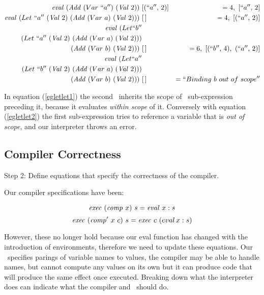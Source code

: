 \documentclass {article}
\begin{document}
\begin{align}
\mathit{eval\ }  (\mathit{Add\ } (Var\ ``a'')\ (\mathit{Val\ } 2))\ &[(``a'',\, 2)] 
			&= 4,\ [``a'',\, 2] \nonumber \\
\mathit{eval\ }  (Let\ ``a''\ (\mathit{Val\ } 2)\ (\mathit{Add\ } (Var\ a)\ (\mathit{Val\ } 2))  )\ &[\, ] 
		&= 4,\ [(``a'',\, 2)] \nonumber \\ 
\mathit{eval\ }  (Let ``b'' \nonumber \\
		(Let\ ``a''\ (\mathit{Val\ } 2) \
			 (\mathit{Add\ } (Var\ a)\ (\mathit{Val\ } 2))  ) \nonumber \\
		(\mathit{Add\ } (Var\ b)\ (\mathit{Val\ } 2)))\ &[\, ] 
		&= 6,\ [(``b'',\, 4),\ (``a'',\, 2)] \label{egletlet1} \\ 
\mathit{eval\ }  (Let ``a'' \nonumber \\
		(Let\ ``b''\ (\mathit{Val\ } 2) \
			 (\mathit{Add\ } (Var\ a)\ (\mathit{Val\ } 2))  ) \nonumber \\
		(\mathit{Add\ } (Var\ b)\ (\mathit{Val\ } 2)))\ &[\, ] 
		&= ``Binding\ b\ out\ of\ scope'' \label{egletlet2} \nonumber \\
\end{align}

In equation (\ref{egletlet1})
the second \add\ inherits
the scope of \ sub-expression 
preceding it, 
because it evaluates
\emph{within scope} of it.
Conversely with equation (\ref{egletlet2})
the first sub-expression tries to reference
a variable that is \emph{out of scope},
and our interpreter throws an error.



\subsection{Compiler Correctness}

Step 2: Define equations that specify the
	correctness of the compiler.

Our compiler specifications have been:

	\[ \mathit{exec\ }  (\mathit{comp\ }  x)\  s = \mathit{eval\ }   x:s \]
	\[ \mathit{exec\ }  (\mathit{comp'\ }   x\  c)\ s = \mathit{exec\ }  c\  (eval \, x:s) \]

However, these no longer hold
because our eval function has changed
with the introduction of environments,
therefore we need to update these equations.
\linebreak
Our \env\ specifies parings of 
variable names to values,
the compiler may be able to handle names,
but cannot compute any 
values on its own
but it can produce code that will
produce the same effect once executed.
Breaking down what the interpreter
does can indicate what the 
compiler and \vm\ should do.
\end{document}
